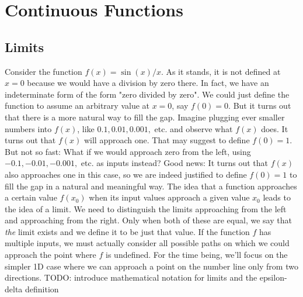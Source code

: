 \section{Continuous Functions}

\subsection{Limits}
Consider the function $f(x) = \sin (x) / x$. As it stands, it is not defined at $x = 0$ because we would have a division by zero there. In fact, we have an indeterminate form of the form "zero divided by zero". We could just define the function to assume an arbitrary value at $x = 0$, say $f(0) = 0$. But it turns out that there is a more natural way to fill the gap. Imagine plugging ever smaller numbers into $f(x)$, like $0.1, 0.01, 0.001, $ etc. and observe what $f(x)$ does. It turns out that $f(x)$ will approach one. That may suggest to define $f(0) = 1$. But not so fast: What if we would approach zero from the left, using $-0.1, -0.01, -0.001,$ etc. as inputs instead? Good news: It turns out that $f(x)$ also approaches one in this case, so we are indeed justified to define $f(0)=1$ to fill the gap in a natural and meaningful way. The idea that a function approaches a certain value $f(x_0)$ when its input values approach a given value $x_0$ leads to the idea of a limit. We need to distinguish the limits approaching from the left and approaching from the right. Only when both of these are equal, we say that \emph{the} limit exists and we define it to be just that value. If the function $f$ has multiple inputs, we must actually consider all possible paths on which we could approach the point where $f$ is undefined. For the time being, we'll focus on the simpler 1D case where we can approach a point on the number line only from two directions.
TODO: introduce mathematical notation for limits and the epsilon-delta definition








